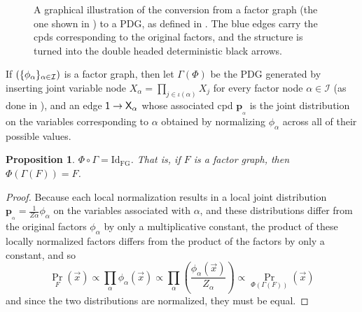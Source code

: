 \documentclass{article}
\theoremstyle{plain}
\newtheorem{prop}[theorem]{Proposition}
\theoremstyle{definition}
\theoremstyle{remark}
\newcommand\mat[1]{\mathbf{#1}}
\newcommand{\bp}[1][L]{\mat{p}_{\!_{#1}\!}}
\newcommand\PDGof{\Gamma}
\numberwithin{equation}{section}
\begin{document}
\begin{figure}[htb]
{}
		
		\caption{A graphical illustration of the conversion from a factor graph (the one shown in ) to a PDG, as defined in . The blue edges carry the cpds corresponding to the original factors, and the structure is turned into the double headed deterministic black arrows.}
		\label{fig:fg2PDG}
	\end{figure}
	
	\begin{defn} \label{def:fg2PDG}
		If $(\{\phi_\alpha\}_{\alpha \in \cal I})$ is a factor graph, then let $\PDGof(\Phi)$ be the PDG generated by inserting joint variable node $X_\alpha = \prod_{j \in \iota(\alpha)} X_j$ for every factor node $\alpha \in \mathcal I$ (as done in ), and an edge $\sf 1 \to X_\alpha$ whose associated cpd $\bp[\alpha]$ is the joint distribution on the variables corresponding to $\alpha$ obtained by normalizing $\phi_\alpha$ across all of their possible values.%
	\end{defn}

	\begin{prop}\label{prop:fg-pdg-lossless}
		$\Phi \circ \PDGof = \mathrm{Id}_{\text{FG}}$. That is, if $F$ is a factor graph, then $\Phi(\PDGof(F)) = F$.
	\end{prop}
	\begin{proof}
		Because each local normalization results in a local joint
                distribution $\bp[\alpha] = \frac{1}{Z\alpha}
                \phi_\alpha$ on the variables associated with $\alpha$, and these distributions differ from the original factors $\phi_\alpha$ by only a multiplicative 
               constant, the product of these locally normalized factors differs from the product of the factors by only a constant, and so 
		\[ \Pr_F(\vec x) \propto \prod_\alpha \phi_\alpha(\vec x) \propto \prod_\alpha \left(\frac{\phi_\alpha(\vec x)}{Z_\alpha}\right) \propto \Pr_{\Phi(\PDGof(F))}(\vec x) \]
		and since the two distributions are normalized, they must be equal.
	\end{proof}
	
\end{document}
